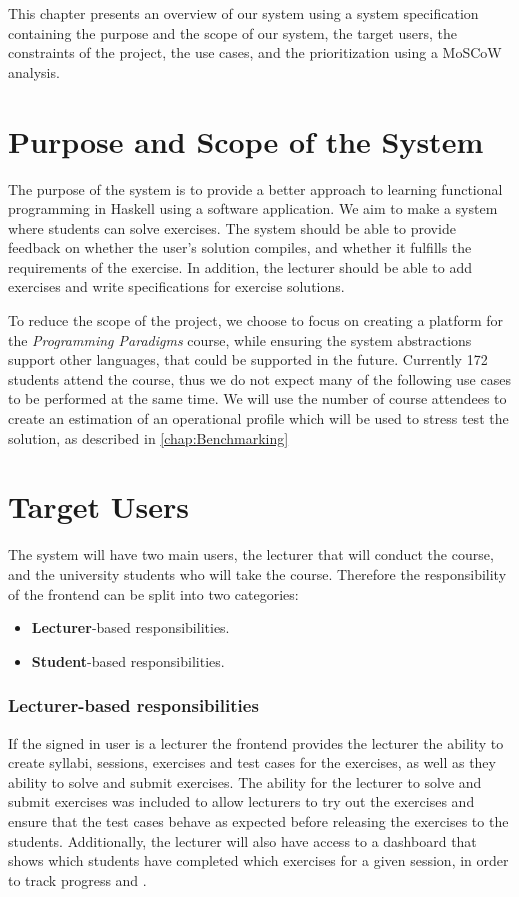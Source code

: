 This chapter presents an overview of our system using a system specification containing the purpose and the scope of our system, the target users, the constraints of the project, the use cases, and the prioritization using a MoSCoW analysis. 

\section*{Purpose and Scope of the System}
The purpose of the system is to provide a better approach to learning functional programming in Haskell using a software application.
We aim to make a system where students can solve exercises. The system should be able to provide feedback on whether the user's solution compiles, and whether it fulfills the requirements of the exercise.
In addition, the lecturer should be able to add exercises and write specifications for exercise solutions.

To reduce the scope of the project, we choose to focus on creating a platform for the \textit{Programming Paradigms} course, while ensuring the system abstractions support other languages, that could be supported in the future. 
Currently 172 students attend the course, thus we do not expect many of the following use cases to be performed at the same time.
We will use the number of course attendees to create an estimation of an operational profile which will be used to stress test the solution, as described in \ref{chap:Benchmarking} 

\section*{Target Users}
The system will have two main users, the lecturer that will conduct the course, and the university students who will take the course.
Therefore the responsibility of the frontend can be split into two categories:
\begin{itemize}
    \item \textbf{Lecturer}-based responsibilities.
    \item \textbf{Student}-based responsibilities.
\end{itemize}

\subsubsection*{Lecturer-based responsibilities}
If the signed in user is a lecturer the frontend provides the lecturer the ability to create syllabi, sessions, exercises and test cases for the exercises, as well as they ability  to solve and submit exercises. The ability for the lecturer to solve and submit exercises was included to allow lecturers to try out the exercises and ensure that the test cases behave as expected before releasing the exercises to the students. Additionally, the lecturer will also have access to a dashboard that shows which students have completed which exercises for a given session, in order to track progress and .

